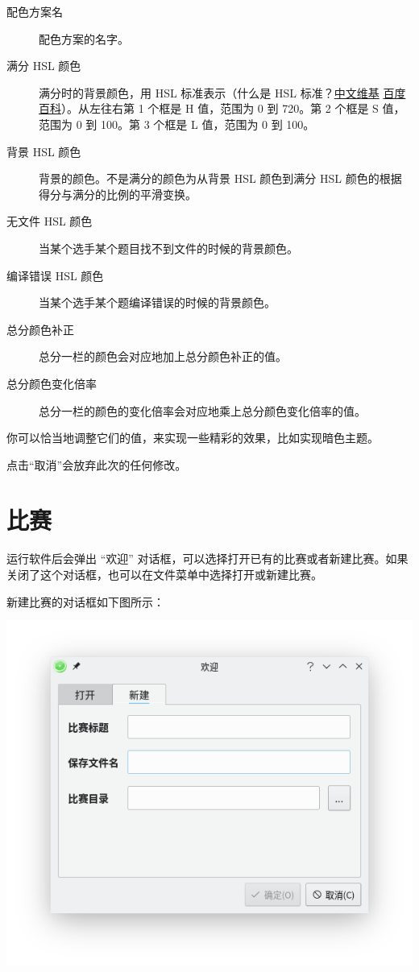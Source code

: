 \documentclass[UTF-8]{ctexart}
\begin{document}
				\begin{description}
					\item[配色方案名] 配色方案的名字。
					\item[满分 HSL 颜色] 满分时的背景颜色，用 HSL 标准表示（什么是 HSL 标准？\href{https://zh.wikipedia.org/zh-hans/HSL和HSV色彩空间}{中文维基} \href{https://baike.baidu.com/item/HSL/1443144?fr=aladdin}{百度百科}）。从左往右第 1 个框是 H 值，范围为 0 到 720。第 2 个框是 S 值，范围为 0 到 100。第 3 个框是 L 值，范围为 0 到 100。
					\item[背景 HSL 颜色] 背景的颜色。不是满分的颜色为从背景 HSL 颜色到满分 HSL 颜色的根据得分与满分的比例的平滑变换。
					\item[无文件 HSL 颜色] 当某个选手某个题目找不到文件的时候的背景颜色。
					\item[编译错误 HSL 颜色] 当某个选手某个题编译错误的时候的背景颜色。
					\item[总分颜色补正] 总分一栏的颜色会对应地加上总分颜色补正的值。
					\item[总分颜色变化倍率] 总分一栏的颜色的变化倍率会对应地乘上总分颜色变化倍率的值。
				\end{description}

				你可以恰当地调整它们的值，来实现一些精彩的效果，比如实现暗色主题。
				
				点击“取消”会放弃此次的任何修改。

		\newpage


		\section{比赛}

			运行软件后会弹出 “欢迎” 对话框，可以选择打开已有的比赛或者新建比赛。如果关闭了这个对话框，也可以在文件菜单中选择打开或新建比赛。

			新建比赛的对话框如下图所示：

			\begin{center}
			\includegraphics[scale=0.7]{pics/newcontest.png}
			\end{center}
\end{document}
